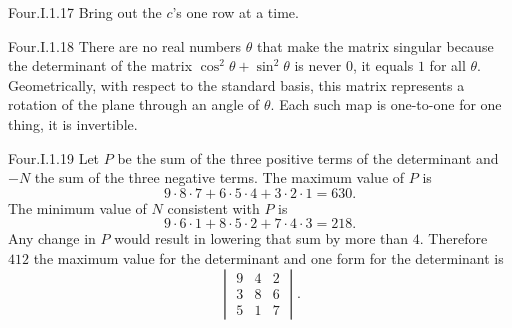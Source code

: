 \begin{ans}{Four.I.1.17}
       Bring out the \( c \)'s one row at a time.
    
\end{ans}
\begin{ans}{Four.I.1.18}
      There are no real numbers \( \theta \) that make the matrix singular
      because the determinant of the matrix
      \( \cos^2\theta+\sin^2\theta \) is never $0$, it equals $1$
      for all $\theta$.
      Geometrically, with respect to the standard basis,
      this matrix represents
      a rotation of the plane through an angle of \( \theta \).
      Each such map is one-to-one \Dash  for one thing, it is invertible.
    
\end{ans}
\begin{ans}{Four.I.1.19}
      \answerasgiven
      Let \( P \) be the sum of the three positive terms of the determinant
      and \( -N \) the sum of the three negative terms.
      The maximum value of \( P \) is
      \begin{equation*}
        9\cdot 8\cdot 7 +6\cdot 5\cdot 4 +3\cdot 2\cdot 1=630.
      \end{equation*}
      The minimum value of \( N \) consistent with \( P \) is
      \begin{equation*}
        9\cdot 6\cdot 1 +8\cdot 5\cdot 2 +7\cdot 4\cdot 3=218.
      \end{equation*}
      Any change in \( P \) would result in lowering that sum by more than
      \( 4 \).
      Therefore \( 412 \) the maximum value for the determinant and one form
      for the determinant is
      \begin{equation*}
         \begin{vmatrix}
            9  &4  &2  \\
            3  &8  &6  \\
            5  &1  &7
         \end{vmatrix}.
      \end{equation*}
    
\end{ans}
